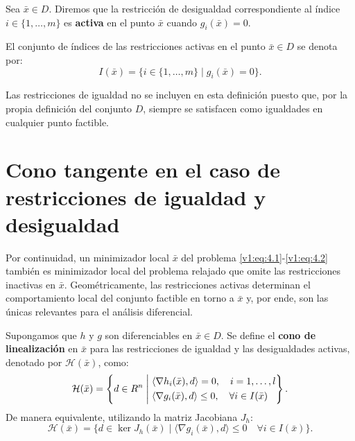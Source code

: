 \begin{definition}\label{v1:def:4.0.1}
 Sea $\bar{x} \in D$. Diremos que la restricción de desigualdad correspondiente al índice $i \in \{1, \dots, m\}$ es \textbf{activa} en el punto $\bar{x}$ cuando $g_i(\bar{x}) = 0$.
 
 El conjunto de índices de las restricciones activas en el punto $\bar{x} \in D$ se denota por:
 \[
 I(\bar{x}) = \{ i \in \{1, \dots, m\} \mid g_i(\bar{x}) = 0 \}.
 \]
\end{definition}

\begin{notation}
 Las restricciones de igualdad no se incluyen en esta definición puesto que, por la propia definición del conjunto $D$, siempre se satisfacen como igualdades en cualquier punto factible.
\end{notation}

\section{Cono tangente en el caso de restricciones de igualdad y desigualdad}

Por continuidad, un minimizador local $\bar{x}$ del problema \eqref{v1:eq:4.1}-\eqref{v1:eq:4.2} también es minimizador local del problema relajado que omite las restricciones inactivas en $\bar{x}$. Geométricamente, las restricciones activas determinan el comportamiento local del conjunto factible en torno a $\bar{x}$ y, por ende, son las únicas relevantes para el análisis diferencial.

\begin{definition}\label{v1:def:cono_linealizacion}
 Supongamos que $h$ y $g$ son diferenciables en $\bar{x} \in D$. Se define el \textbf{cono de linealización} en $\bar{x}$ para las restricciones de igualdad y las desigualdades activas, denotado por $\mathcal{H}(\bar{x})$, como:
 \begin{equation}
 \mathcal{H}(\bar{x}) = \left\{ d \in R^n \mathrel{\Bigg|} \begin{aligned} &\langle \nabla h_i(\bar{x}), d \rangle = 0, \quad i = 1, \dots, l \\ &\langle \nabla g_i(\bar{x}), d \rangle \le 0, \quad \forall i \in I(\bar{x}) \end{aligned} \right\}.
 \label{v1:eq:4.6}
 \end{equation}
 De manera equivalente, utilizando la matriz Jacobiana $J_h$:
 \[
 \mathcal{H}(\bar{x}) = \{ d \in \ker J_h(\bar{x}) \mid \langle \nabla g_i(\bar{x}), d \rangle \le 0 \quad \forall i \in I(\bar{x}) \}.
 \]
\end{definition}

